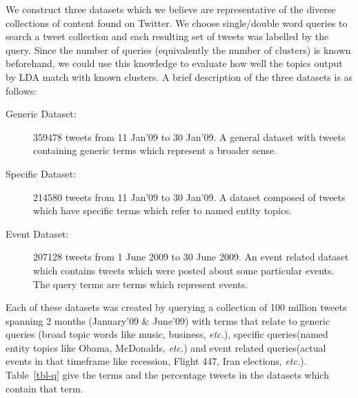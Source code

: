 \documentclass[10pt,a5paper,twoside]{article}
\begin{document}
We construct three datasets which we believe are representative of the diverse collections of content found on Twitter.  We choose single/double word queries to search a tweet collection and each resulting set of tweets was labelled by the query. Since the number of queries (equivalently the number of clusters) is known beforehand, we could use this knowledge to evaluate how well the topics output by LDA match with known clusters. A brief description of the three datasets is as follows:\vspace{-5pt}
\begin{description}
\item[Generic Dataset: ]
 359478 tweets from 11 Jan'09 to 30 Jan'09.
A general dataset with tweets containing generic terms which represent a broader sense.\vspace{-5pt}
\item[Specific Dataset: ]
214580 tweets from 11 Jan'09 to 30 Jan'09.
A dataset composed of tweets which have specific terms which refer to named entity topics.\vspace{-5pt}
\item[Event Dataset: ]
207128 tweets from 1 June 2009 to 30 June 2009.
An event related dataset which contains tweets which were posted about some particular events. The query terms are terms which represent events.\vspace{-5pt}
\end{description}
Each of these datasets was created by querying a collection of 100 million tweets spanning 2 months (January'09 \& June'09) with terms that relate to generic queries (broad topic words like music, business, {\it  etc.}), specific queries(named entity topics like Obama, McDonalds, {\it etc.}) and event related queries(actual events in that timeframe like recession, Flight 447, Iran elections, 
{\it etc.}). 
Table~\ref{tbl-q} give the terms and the percentage tweets in the datasets which contain that term.
\end{document}

